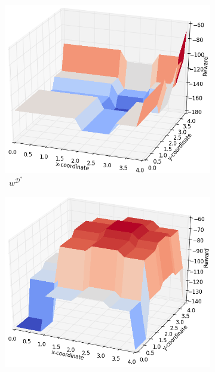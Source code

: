 \documentclass[a4paper,11pt]{report}
\begin{document}
\begin{figure}[thb]
  \centering
  \begin{subfigure}[b]{0.42\columnwidth}

    \includegraphics[clip=true,width=\textwidth]{figures/RF_D.png}

    
    \caption{\ $w^{\mathcal{D}^*}$}
    \label{fig:rf_plot_good}
  \end{subfigure}
  \begin{subfigure}[b]{0.42\columnwidth}

    \includegraphics[clip=true,width=\textwidth]{figures/RF_F.png}


\end{subfigure}
\end{figure}
\end{document}
